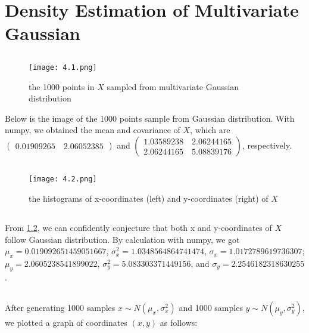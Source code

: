 \documentclass{article}
\begin{document}
    \section{Density Estimation of Multivariate Gaussian}
    \subsection{}\label{4.1}
        \begin{figure}[hbt!]\label{4.1pic}
            \centering
            \caption{the 1000 points in $X$ sampled from multivariate Gaussian distribution}
            \texttt{[image: 4.1.png]}
        \end{figure}
        Below is the image of the 1000 points sample from Gaussian distribution. 
        With numpy, we obtained the mean and covariance of $X$, 
        which are $\begin{pmatrix}0.01909265\quad2.06052385\end{pmatrix}$ and 
        $\begin{pmatrix}1.03589238\quad2.06244165\\2.06244165\quad5.08839176\end{pmatrix}$, respectively.\\

    \subsection{}\label{4.2}
        \begin{figure}[hbt!]\label{4.2pic}
            \centering
            \caption{the histograms of x-coordinates (left) and y-coordinates (right) of $X$}
            \texttt{[image: 4.2.png]}
        \end{figure}

    \subsection{}\label{4.3}
        From \ref{4.2}, we can confidently conjecture that both x and y-coordinates of $X$ follow Gaussian distribution.
        By calculation with numpy, we got $\mu_x=0.019092651459051667$, $\sigma_x^2=1.0348564864741474$, $\sigma_x=1.0172789619736307$;
        $\mu_y=2.0605238541899022$, $\sigma_y^2=5.083303371449156$, and $\sigma_y=2.2546182318630255$.

    \subsection{}\label{4.4}
        After generating 1000 samples $x\sim N(\mu_x, \sigma_x^2)$ and 1000 samples $y\sim N(\mu_y, \sigma_y^2)$,
        we plotted a graph of coordinates $(x,y)$ as follows:
\end{document}
